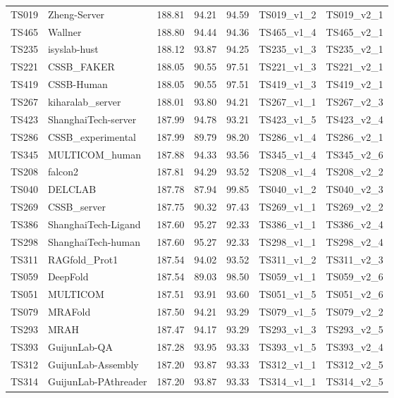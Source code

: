 \begin{table}[ht]
{\begin{tabular}{llrrrll}
TS019 & Zheng-Server & 188.81 & 94.21 & 94.59 & TS019\_v1\_2 & TS019\_v2\_1 \\ 
TS465 & Wallner & 188.80 & 94.44 & 94.36 & TS465\_v1\_4 & TS465\_v2\_1 \\ 
TS235 & isyslab-hust & 188.12 & 93.87 & 94.25 & TS235\_v1\_3 & TS235\_v2\_1 \\ 
TS221 & CSSB\_FAKER & 188.05 & 90.55 & 97.51 & TS221\_v1\_3 & TS221\_v2\_1 \\ 
TS419 & CSSB-Human & 188.05 & 90.55 & 97.51 & TS419\_v1\_3 & TS419\_v2\_1 \\ 
TS267 & kiharalab\_server & 188.01 & 93.80 & 94.21 & TS267\_v1\_1 & TS267\_v2\_3 \\ 
TS423 & ShanghaiTech-server & 187.99 & 94.78 & 93.21 & TS423\_v1\_5 & TS423\_v2\_4 \\ 
TS286 & CSSB\_experimental & 187.99 & 89.79 & 98.20 & TS286\_v1\_4 & TS286\_v2\_1 \\ 
TS345 & MULTICOM\_human & 187.88 & 94.33 & 93.56 & TS345\_v1\_4 & TS345\_v2\_6 \\ 
TS208 & falcon2 & 187.81 & 94.29 & 93.52 & TS208\_v1\_4 & TS208\_v2\_2 \\ 
TS040 & DELCLAB & 187.78 & 87.94 & 99.85 & TS040\_v1\_2 & TS040\_v2\_3 \\ 
TS269 & CSSB\_server & 187.75 & 90.32 & 97.43 & TS269\_v1\_1 & TS269\_v2\_2 \\ 
TS386 & ShanghaiTech-Ligand & 187.60 & 95.27 & 92.33 & TS386\_v1\_1 & TS386\_v2\_4 \\ 
TS298 & ShanghaiTech-human & 187.60 & 95.27 & 92.33 & TS298\_v1\_1 & TS298\_v2\_4 \\ 
TS311 & RAGfold\_Prot1 & 187.54 & 94.02 & 93.52 & TS311\_v1\_2 & TS311\_v2\_3 \\ 
TS059 & DeepFold & 187.54 & 89.03 & 98.50 & TS059\_v1\_1 & TS059\_v2\_6 \\ 
TS051 & MULTICOM & 187.51 & 93.91 & 93.60 & TS051\_v1\_5 & TS051\_v2\_6 \\ 
TS079 & MRAFold & 187.50 & 94.21 & 93.29 & TS079\_v1\_5 & TS079\_v2\_2 \\ 
TS293 & MRAH & 187.47 & 94.17 & 93.29 & TS293\_v1\_3 & TS293\_v2\_5 \\ 
TS393 & GuijunLab-QA & 187.28 & 93.95 & 93.33 & TS393\_v1\_5 & TS393\_v2\_4 \\ 
TS312 & GuijunLab-Assembly & 187.20 & 93.87 & 93.33 & TS312\_v1\_1 & TS312\_v2\_5 \\ 
TS314 & GuijunLab-PAthreader & 187.20 & 93.87 & 93.33 & TS314\_v1\_1 & TS314\_v2\_5 \\ 

\end{tabular}}
\end{table}
